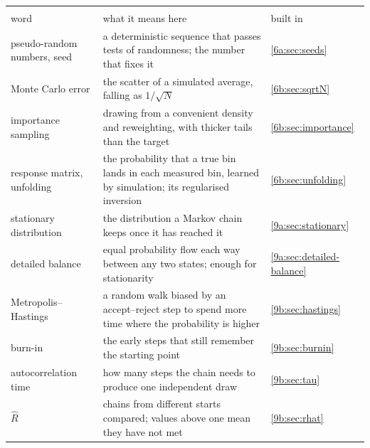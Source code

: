 \begin{center}
\small
\renewcommand{\arraystretch}{1.18}
\begin{tabularx}{\linewidth}{@{}>{\raggedright\arraybackslash}p{3.0cm}
                               >{\raggedright\arraybackslash}X
                               >{\raggedright\arraybackslash}p{2.0cm}@{}}
\toprule
\multicolumn{3}{@{}l}{\textbf{Simulation and chains}}\\
word & what it means here & built in\\\midrule
pseudo-random numbers, seed & a deterministic sequence that passes tests of randomness; the number that fixes it & \cref{6a:sec:seeds}\\
Monte Carlo error & the scatter of a simulated average, falling as $1/\sqrt N$ & \cref{6b:sec:sqrtN}\\
importance sampling & drawing from a convenient density and reweighting, with thicker tails than the target & \cref{6b:sec:importance}\\
response matrix, unfolding & the probability that a true bin lands in each measured bin, learned by simulation; its regularised inversion & \cref{6b:sec:unfolding}\\
stationary distribution & the distribution a Markov chain keeps once it has reached it & \cref{9a:sec:stationary}\\
detailed balance & equal probability flow each way between any two states; enough for stationarity & \cref{9a:sec:detailed-balance}\\
Metropolis--Hastings & a random walk biased by an accept--reject step to spend more time where the probability is higher & \cref{9b:sec:hastings}\\
burn-in & the early steps that still remember the starting point & \cref{9b:sec:burnin}\\
autocorrelation time & how many steps the chain needs to produce one independent draw & \cref{9b:sec:tau}\\
$\hat R$ & chains from different starts compared; values above one mean they have not met & \cref{9b:sec:rhat}\\
\bottomrule
\end{tabularx}
\end{center}

